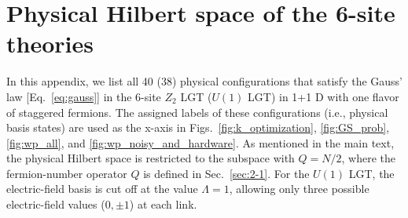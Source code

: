 \documentclass[a4paper,onecolumn,11pt,accepted=2024-10-11]{quantumarticle}
\begin{document}
\section{Physical Hilbert space of the 6-site theories
\label{app:state-labels}}
\noindent
In this appendix, we list all 40 (38) physical configurations that satisfy the Gauss' law [Eq.~\eqref{eq:gauss}] in the 6-site $Z_2$ LGT ($U(1)$ LGT) in 1+1 D with one flavor of staggered fermions. The assigned labels of these configurations (i.e., physical basis states) are used as the x-axis in Figs.~\ref{fig:k_optimization}, \ref{fig:GS_prob}, \ref{fig:wp_all}, and \ref{fig:wp_noisy_and_hardware}. As mentioned in the main text, the physical Hilbert space is restricted to the subspace with $Q=N/2$, where the fermion-number operator $Q$ is defined in Sec.~\ref{sec:2-1}. For the $U(1)$ LGT, the electric-field basis is cut off at the value $\Lambda=1$, allowing only three possible electric-field values ($0,\pm 1$) at each link.
%
\end{document}
